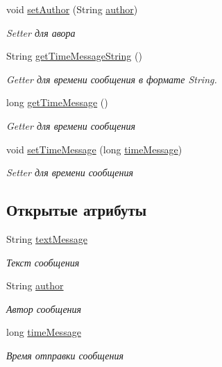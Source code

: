 \begin{DoxyCompactItemize}
void \mbox{\hyperlink{classcom_1_1example_1_1firebasechat_1_1_message_a8fd45837a4a4bd7682909d5c8d4d11b6}{set\+Author}} (String \mbox{\hyperlink{classcom_1_1example_1_1firebasechat_1_1_message_a8d952ef9a02a74e7c419f335020fea23}{author}})
\begin{DoxyCompactList}\small\item\em Setter для авора \end{DoxyCompactList}\item 
String \mbox{\hyperlink{classcom_1_1example_1_1firebasechat_1_1_message_a3616de6e6cf9ddcfee8b09ac520133e4}{get\+Time\+Message\+String}} ()
\begin{DoxyCompactList}\small\item\em Getter для времени сообщения в формате String. \end{DoxyCompactList}\item 
long \mbox{\hyperlink{classcom_1_1example_1_1firebasechat_1_1_message_a3c210d1ca7c8582e702aff4c1e6fdd47}{get\+Time\+Message}} ()
\begin{DoxyCompactList}\small\item\em Getter для времени сообщения \end{DoxyCompactList}\item 
void \mbox{\hyperlink{classcom_1_1example_1_1firebasechat_1_1_message_a49fdc6fad71c37aa636d43400c8c63bc}{set\+Time\+Message}} (long \mbox{\hyperlink{classcom_1_1example_1_1firebasechat_1_1_message_a09635d0a02cd29c65625d1d1c2a616a3}{time\+Message}})
\begin{DoxyCompactList}\small\item\em Setter для времени сообщения \end{DoxyCompactList}\end{DoxyCompactItemize}
\subsection*{Открытые атрибуты}
\begin{DoxyCompactItemize}
\item 
String \mbox{\hyperlink{classcom_1_1example_1_1firebasechat_1_1_message_acb2c8f619df31749afdc79e92b1481e8}{text\+Message}}
\begin{DoxyCompactList}\small\item\em Текст сообщения \end{DoxyCompactList}\item 
String \mbox{\hyperlink{classcom_1_1example_1_1firebasechat_1_1_message_a8d952ef9a02a74e7c419f335020fea23}{author}}
\begin{DoxyCompactList}\small\item\em Автор сообщения \end{DoxyCompactList}\item 
long \mbox{\hyperlink{classcom_1_1example_1_1firebasechat_1_1_message_a09635d0a02cd29c65625d1d1c2a616a3}{time\+Message}}
\begin{DoxyCompactList}\small\item\em Время отправки сообщения \end{DoxyCompactList}\end{DoxyCompactItemize}


